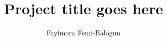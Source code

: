 \documentclass[a4paper,12pt,twoside]{report}
\begin{document}
\title{Project title goes here}
\author{Fayimora Femi-Balogun}
\normallinespacing
\maketitle

\preface


% 


\body





\appendix
\appendixpage
\addappheadtotoc



\end{document}
